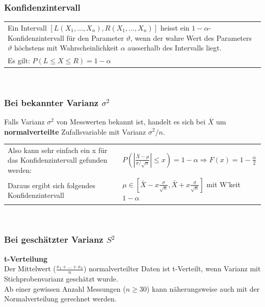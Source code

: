 		\subsubsection{Konfidenzintervall }
			\begin{tabular}{p{18cm}}
		     Ein Intervall $[L(X_1,\ldots,X_n),R(X_1,\ldots,X_n)]$ heisst ein
		     $1-\alpha$- Konfidenzintervall für den Parameter $\vartheta$, wenn der wahre
		     Wert des Parameters $\vartheta$ höchstens mit Wahrscheinlichkeit $\alpha$
		     ausserhalb des Intervalls liegt.\\
		     Es gilt: $P(L \leq X \leq R) = 1-\alpha$
		    \end{tabular}\\
		    
	   
    \subsubsection{Bei bekannter Varianz $\sigma^2$}
     Falls Varianz $\sigma^2$ von Messwerten bekannt ist, handelt es sich bei $\bar{X}$ um \textbf{normalverteilte} Zufallsvariable mit Varianz $\sigma^2/n$. \\
    \begin{tabular}{p{8cm}p{8cm}}
    Also kann sehr einfach ein x für das Konfidenzintervall gefunden werden:
    &$P\left(\left|\frac{\bar{X}-\mu}{\sigma / \sqrt{n}}\right|\leq x\right) = 1 - \alpha \Rightarrow F(x) = 1- \frac{\alpha}{2}$\\
    Daraus ergibt sich folgendes Konfidenzintervall
    &$\mu\in\left[\bar{X}-x\frac{\sigma}{\sqrt{n}},\bar{X}+x\frac{\sigma}{\sqrt{n}}\right]$ mit W'keit $1-\alpha$\\
    \end{tabular}\\
    
    \subsubsection{Bei geschätzter Varianz $S^2$}
    \textbf{t-Verteilung}\\
    	Der Mittelwert ($\frac{x_1+\ldots+x_n}{n}$) normalverteilter Daten ist
        t-Verteilt, wenn Varianz mit Stichprobenvarianz geschätzt wurde.\\
        Ab einer gewissen Anzahl Messungen ($n \geq 30$) kann näherungsweise auch mit
        der Normalverteilung gerechnet werden.  \\
    

